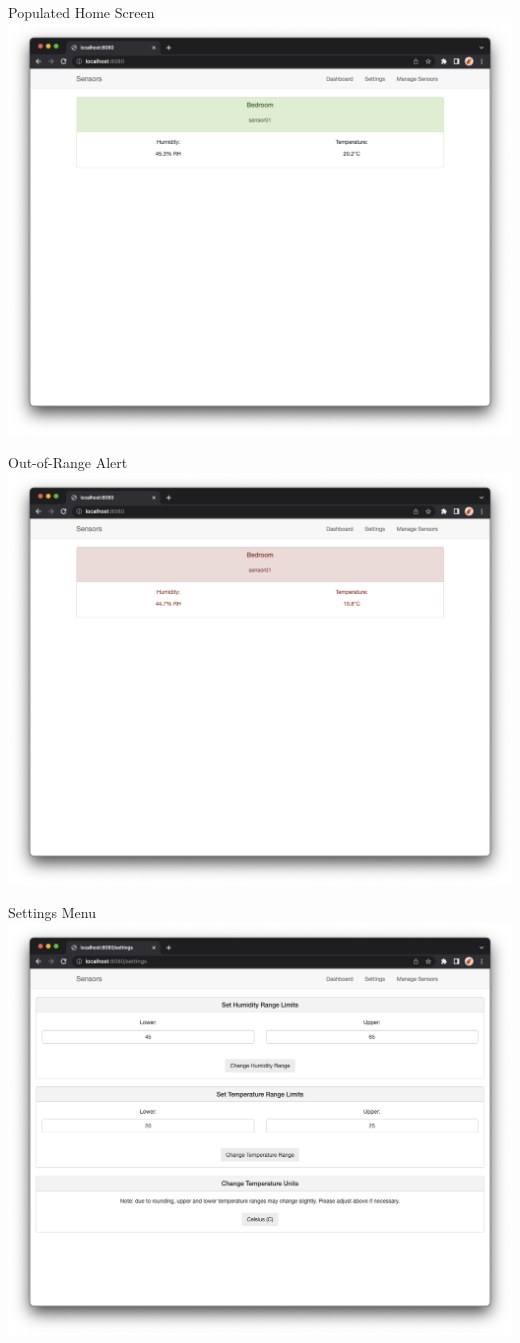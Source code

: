 \documentclass[aspectratio=169]{beamer}
\begin{document}
  \begin{frame}{\sectitle}{Populated Home Screen}
    \centering\includegraphics[width=.75\textwidth]{images/03-added.png}
  \end{frame}
  \begin{frame}{\sectitle}{Out-of-Range Alert}
    \centering\includegraphics[width=.75\textwidth]{images/04-out_of_range.png}
  \end{frame}
  \begin{frame}{\sectitle}{Settings Menu}
    \centering\includegraphics[width=.75\textwidth]{images/05-settings.png}
  \end{frame}
\end{document}
